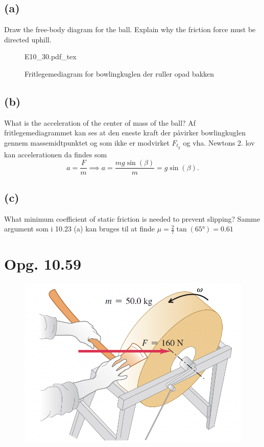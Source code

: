 \documentclass[12pt]{article}
\newcommand{\incfig}[2][1]{%
  \def\svgwidth{#1\columnwidth}
  {#2.pdf_tex}
}
\begin{document}
\subsection*{(a)}
Draw the free-body diagram for the ball. Explain why the friction force must be directed uphill.
\bigbreak
\begin{figure}[ht]
  \centering
  \incfig[0.5]{E10_30}
  \caption{Fritlegemediagram for bowlingkuglen der ruller opad bakken}
  \label{fig:E10_30}
\end{figure}


\subsection*{(b)}
What is the acceleration of the center of mass of the ball?
\bigbreak
Af fritlegemediagrammet kan ses at den eneste kraft der påvirker bowlingkuglen gennem massemidtpunktet og som ikke er modvirket $F_{t_y}$ og vha. Newtons 2. lov kan accelerationen da findes som
\[
a = \frac{F}{m} \implies a = \frac{mg \sin (\beta)}{m} = g \sin(\beta)
.\] 


\subsection*{(c)}
What minimum coefficient of static friction is needed to prevent slipping?
\bigbreak
Samme argument som i 10.23 (a) kan bruges til at finde $\mu = \frac{2}{7} \tan(\ang{65}) = \num{0,61}$


\section*{Opg. 10.59}
\begin{figure} [ht]
  \centering
  \caption{}
  \includegraphics[width=0.35\linewidth]{../figures/P10_58.png}
  \label{fig:P10_58}
\end{figure}
\end{document}
